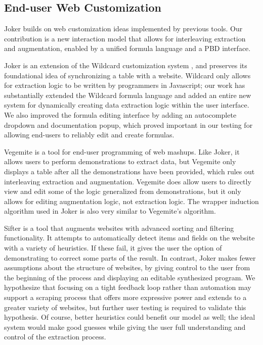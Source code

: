 \documentclass[conference]{IEEEtran}
\begin{document}
\hypertarget{end-user-web-customization}{%
\subsection{End-user Web
Customization}\label{end-user-web-customization}}

Joker builds on web customization ideas implemented by previous tools.
Our contribution is a new interaction model that allows for interleaving
extraction and augmentation, enabled by a unified formula language and a
PBD interface.

Joker is an extension of the Wildcard customization system
\citep{litt2020}, and preserves its foundational idea of synchronizing a
table with a website. Wildcard only allows for extraction logic to be
written by programmers in Javascript; our work has substantially
extended the Wildcard formula language and added an entire new system
for dynamically creating data extraction logic within the user
interface. We also improved the formula editing interface by adding an
autocomplete dropdown and documentation popup, which proved important in
our testing for allowing end-users to reliably edit and create formulas.

Vegemite \citep{lin2009} is a tool for end-user programming of web
mashups. Like Joker, it allows users to perform demonstrations to
extract data, but Vegemite only displays a table after all the
demonstrations have been provided, which rules out interleaving
extraction and augmentation. Vegemite does allow users to directly view
and edit some of the logic generalized from demonstrations, but it only
allows for editing augmentation logic, not extraction logic. The wrapper
induction algorithm used in Joker is also very similar to Vegemite's
algorithm.

Sifter \citep{huynh2006} is a tool that augments websites with advanced
sorting and filtering functionality. It attempts to automatically detect
items and fields on the website with a variety of heuristics. If these
fail, it gives the user the option of demonstrating to correct some
parts of the result. In contrast, Joker makes fewer assumptions about
the structure of websites, by giving control to the user from the
beginning of the process and displaying an editable synthesized program.
We hypothesize that focusing on a tight feedback loop rather than
automation may support a scraping process that offers more expressive
power and extends to a greater variety of websites, but further user
testing is required to validate this hypothesis. Of course, better
heuristics could benefit our model as well; the ideal system would make
good guesses while giving the user full understanding and control of the
extraction process.
\end{document}
